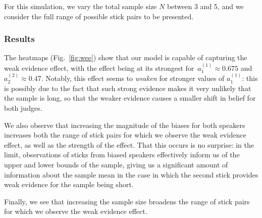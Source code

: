 \documentclass[10pt,letterpaper]{article}
\begin{document}
For this simulation, we vary the total sample size $N$ between 3 and 5, and we consider the full range of possible stick pairs to
be presented.

\subsubsection{Results}
The heatmaps (Fig.~\ref{fig:wee}) show that our model is capable of capturing the weak evidence effect, with the effect being at its 
strongest for~${a_1^{(1)} \approx 0.675}$ and~${a_2^{(2)} \approx 0.47}$. Notably, this effect seems to \textit{weaken} for
stronger values of $a_1^{(1)}$: this is possibly due to the fact that such strong evidence makes it very unlikely that
the sample is long, so that the weaker evidence causes a smaller shift in belief for both judges.

We also observe that increasing the magnitude of the biases for both speakers increases both the range 
of stick pairs for which we observe the weak evidence effect, as well as the strength of the effect. That this occurs is
no surprise: in the limit, observations of sticks from biased speakers effectively inform us of the upper and lower bounds
of the sample, giving us a significant amount of information about the sample mean in the case in which the second stick
provides weak evidence for the sample being short.

Finally, we see that increasing the sample size broadens the range of stick pairs for which we observe the weak evidence
effect.
\end{document}
